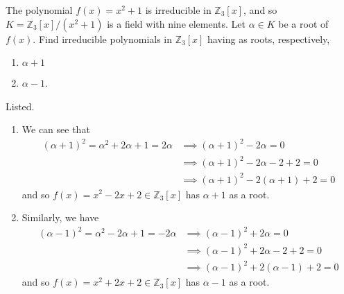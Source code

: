   \begin{exercise}[Shifrin 5.3.3]
    The polynomial $f(x) = x^2 + 1$ is irreducible in $\mathbb{Z}_3[x]$, and so
    $K = \mathbb{Z}_3[x]/(x^2 + 1)$ is a field with nine elements. Let $\alpha \in K$ be
    a root of $f(x)$. Find irreducible polynomials in $\mathbb{Z}_3[x]$ having as
    roots, respectively,
    \begin{enumerate}[label=\alph*.]
      \item $\alpha + 1$
      \item $\alpha - 1$.
    \end{enumerate}
  \end{exercise}
  \begin{solution}
    Listed. 
    \begin{enumerate}
      \item We can see that 
      \begin{align}
        (\alpha + 1)^2 = \alpha^2 + 2\alpha + 1 = 2\alpha & \implies (\alpha + 1)^2 - 2 \alpha = 0 \\
                                                          & \implies (\alpha + 1)^2 - 2\alpha - 2 + 2 = 0 \\
                                                          & \implies (\alpha + 1)^2 - 2(\alpha + 1) + 2 = 0
      \end{align}
      and so $f(x) = x^2 - 2x + 2 \in \mathbb{Z}_3 [x]$ has $\alpha + 1$ as a root. 

      \item Similarly, we have 
      \begin{align}
        (\alpha - 1)^2 = \alpha^2 - 2 \alpha + 1 = -2\alpha & \implies (\alpha - 1)^2 + 2 \alpha = 0 \\
                                                            & \implies (\alpha - 1)^2 + 2 \alpha - 2 + 2 = 0 \\
                                                            & \implies (\alpha - 1)^2 + 2(\alpha - 1) + 2 = 0 
      \end{align}
      and so $f(x) = x^2 + 2x + 2 \in \mathbb{Z}_3 [x]$ has $\alpha - 1$ as a root. 
    \end{enumerate}
  \end{solution}

